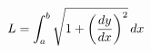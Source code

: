 \documentclass[preview]{standalone}
\begin{document}
\begin{align*}
\special{dvisvgm:raw <g id='unique000'>}L = \int_a^b \sqrt{1 + \left(\frac{dy}{dx}\right)^2}\,dx\special{dvisvgm:raw </g>}
\end{align*}
\end{document}
